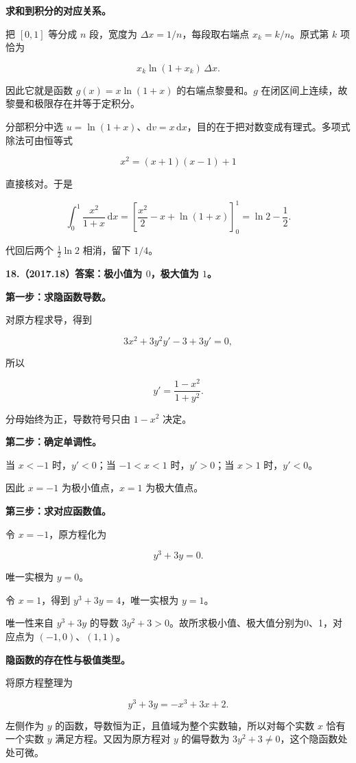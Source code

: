 \documentclass[UTF8,11pt,fontset=windows]{ctexart}
\begin{document}
\textbf{求和到积分的对应关系。}

把 $[0,1]$ 等分成 $n$ 段，宽度为 $\Delta x=1/n$，每段取右端点 $x_k=k/n$。原式第 $k$ 项恰为

$$
x_k\ln(1+x_k)\,\Delta x.
$$

因此它就是函数 $g(x)=x\ln(1+x)$ 的右端点黎曼和。$g$ 在闭区间上连续，故黎曼和极限存在并等于定积分。

分部积分中选 $u=\ln(1+x)$、$\mathrm dv=x\,\mathrm dx$，目的在于把对数变成有理式。多项式除法可由恒等式

$$
x^2=(x+1)(x-1)+1
$$

直接核对。于是

$$
\int_0^1\frac{x^2}{1+x}\,\mathrm dx
=\left[\frac{x^2}{2}-x+\ln(1+x)\right]_0^1
=\ln2-\frac12.
$$

代回后两个 $\tfrac12\ln2$ 相消，留下 $1/4$。

\clearpage

\textbf{18.（2017.18）答案：极小值为 $0$，极大值为 $1$。}

\textbf{第一步：求隐函数导数。}

对原方程求导，得到

$$
3x^2+3y^2y'-3+3y'=0,
$$

所以

$$
y'=\frac{1-x^2}{1+y^2}.
$$

分母始终为正，导数符号只由 $1-x^2$ 决定。

\textbf{第二步：确定单调性。}

当 $x<-1$ 时，$y'<0$；当 $-1<x<1$ 时，$y'>0$；当 $x>1$ 时，$y'<0$。

因此 $x=-1$ 为极小值点，$x=1$ 为极大值点。

\textbf{第三步：求对应函数值。}

令 $x=-1$，原方程化为

$$
y^3+3y=0.
$$

唯一实根为 $y=0$。

令 $x=1$，得到 $y^3+3y=4$，唯一实根为 $y=1$。

唯一性来自 $y^3+3y$ 的导数 $3y^2+3>0$。故所求极小值、极大值分别为0、1，对应点为 $(-1,0)$、$(1,1)$。

\textbf{隐函数的存在性与极值类型。}

将原方程整理为

$$
y^3+3y=-x^3+3x+2.
$$

左侧作为 $y$ 的函数，导数恒为正，且值域为整个实数轴，所以对每个实数 $x$ 恰有一个实数 $y$ 满足方程。又因为原方程对 $y$ 的偏导数为 $3y^2+3\ne0$，这个隐函数处处可微。
\end{document}
